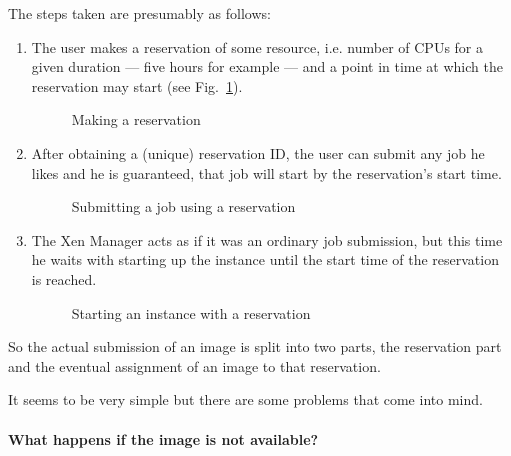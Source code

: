 The steps taken are presumably as follows:
\begin{enumerate}
\item The user  makes a reservation of some resource,  i.e. number of CPUs
  for a given duration --- five hours  for example --- and a point in time
  at       which      the       reservation      may       start      (see
  Fig.~\ref{fig:seq-advance-reservation-1}).
  \begin{figure}[htbp]
    \begin{center}
    \end{center}
    \caption{Making a reservation}
    \label{fig:seq-advance-reservation-1}
  \end{figure}
  
\item After obtaining  a (unique) reservation ID, the  user can submit any
  job  he  likes  and  he  is  guaranteed, that  job  will  start  by  the
  reservation's start time.
  \begin{figure}[htbp]
    \begin{center}
    \end{center}
    \caption{Submitting a job using a reservation}
    \label{fig:seq-advance-reservation-2}
  \end{figure}
  
\item The  Xen Manager acts as if  it was an ordinary  job submission, but
  this time he waits with starting up the instance until the start time of
  the reservation is reached.
  \begin{figure}[htbp]
    \begin{center}
    \end{center}
    \caption{Starting an instance with a reservation}
    \label{fig:seq-advance-reservation-3}
  \end{figure}
\end{enumerate}

So  the  actual submission  of  an  image is  split  into  two parts,  the
reservation  part  and  the  eventual  assignment  of  an  image  to  that
reservation.

It seems  to be  very simple but  there are  some problems that  come into
mind.

\paragraph{What happens if the image is not available?}

